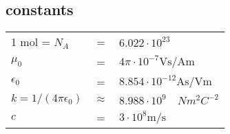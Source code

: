 {	\subsection{constants}
	\begin{tabularx}{\linewidth}{lcX}
		1 \si{\mol} = $N_A$  &=& $6.022\cdot 10^{23}$\\
		$\mu_0$ &=& $4\pi\cdot10^{-7} \si{\volt\second\per\ampere\meter}$\\
		$\epsilon_0$ &=& $8.854\cdot10^{-12} \si{\ampere\second\per\volt\meter}$\\
		$k = 1/(4\pi\epsilon_0)$ &$\approx$& $8.988\cdot 10^9 \quad Nm^2C^{-2}$ \\
		$c$ &=& $3\cdot 10^8 \si{\meter\per\second}$\\
	\end{tabularx}
	
}%